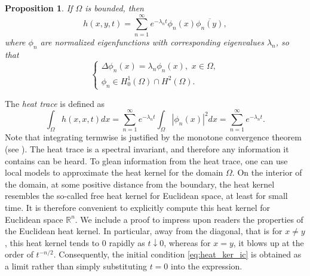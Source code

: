 \documentclass{amsart}
\newtheorem{proposition}[theorem]{Proposition}
\theoremstyle{definition}
\newcommand*{\R}{\mathbb{R}}
\begin{document}
\begin{proposition} \label{prop:heatkernel_eigenfunctions}
    If $\Omega$ is bounded, then
    \begin{equation} \label{eq:heatkernel_eigenfunctions}
        h(x,y,t) = \sum_{n = 1}^\infty e^{-\lambda_nt}\phi_n(x)\overline{\phi_n(y)},
    \end{equation}
    where $\phi_n$ are normalized eigenfunctions with corresponding eigenvalues $\lambda_n$, so that 
    \begin{equation*} 
            \begin{cases}
                \Delta \phi_n(x) = \lambda_n\phi_n(x), \,\, x \in \Omega, \\
                \phi_n \in H_0^1(\Omega) \cap H^2(\Omega).
            \end{cases}
    \end{equation*}
\end{proposition}
The \textit{heat trace} is defined as %
    \begin{equation*}
        \int_\Omega h(x,x,t) dx = \sum_{n = 1}^\infty e^{-\lambda_nt} \int_\Omega|\phi_n(x)|^2 dx = \sum_{n = 1}^\infty e^{-\lambda_nt}.
    \end{equation*}
Note that integrating termwise is justified by the monotone convergence theorem (see \cite[p. 51]{folland1999real}).  The heat trace is a spectral invariant, and therefore any information it contains can be heard.  To glean information from the heat trace, one can use local models to approximate the heat kernel for the domain $\Omega$.  On the interior of the domain, at some positive distance from the boundary, the heat kernel resembles the so-called free heat kernel for Euclidean space, at least for small time.   It is therefore convenient to explicitly compute this heat kernel for Euclidean space $\R^n$.  We include a proof to impress upon readers the properties of the Euclidean heat kernel.  In particular, away from the diagonal, that is for $x \neq y$, this heat kernel tends to $0$ rapidly as $t \downarrow 0$, whereas for $x=y$, it blows up at the order of $t^{-n/2}$.  Consequently, the initial condition \eqref{eq:heat_ker_ic} is obtained as a limit rather than simply substituting $t=0$ into the expression.  
\end{document}
